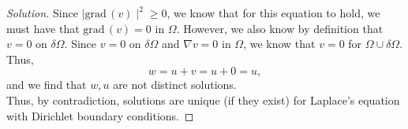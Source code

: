 \documentclass[11pt]{article}
\newenvironment{solution}
  {\renewcommand\qedsymbol{$\blacksquare$}\begin{proof}[Solution]}
  {\end{proof}}
\begin{document}
\begin{solution}
Since $\mid \mathrm{grad} \, (v) \mid^2 \geq 0$, we know that for this equation to hold, we must have that $\mathrm{grad} \, (v) = 0$ in $\Omega.$ However, we also know by definition that $v = 0$ on $\delta \Omega.$ Since $v = 0$ on $\delta \Omega$ and $\nabla v = 0$ in $\Omega$, we know that $v = 0$ for $\Omega \cup \delta \Omega.$ \\

Thus, $$w = u + v = u + 0 = u,$$ and we find that $w, u$ are not distinct solutions.  \\

Thus, by contradiction, solutions are unique (if they exist) for Laplace's equation with Dirichlet boundary conditions.
\end{solution}
\end{document}
